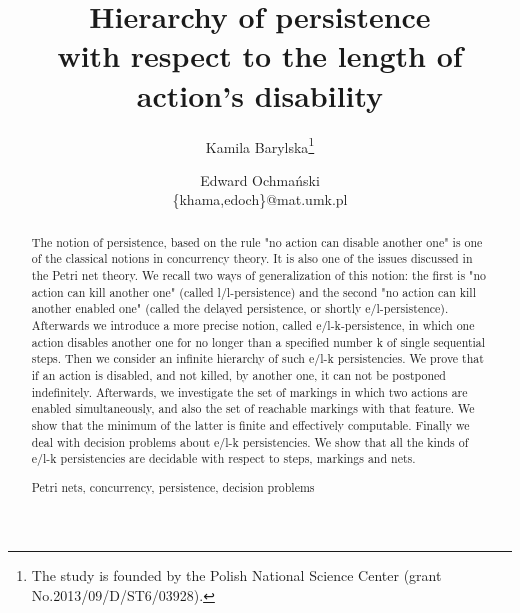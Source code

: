 \documentclass[a4paper]{llncs}
\begin{document}
\title{Hierarchy of persistence \\with respect to the length of action's disability}

\author{Kamila Barylska\thanks{The study is founded 
by the Polish National Science Center
(grant No.2013/09/D/ST6/03928).}\and Edward Ochma\'{n}ski\\
\email\{{khama,edoch\}{@}mat.umk.pl}}


\maketitle

\begin{abstract}
The notion of persistence, based on the rule "no action can disable another one" is one of the classical notions in concurrency theory. It is also one of the issues discussed  in the Petri net theory. We recall two ways of generalization of this notion: the first is "no action can kill another one" (called l/l-persistence) and the second "no action can kill another enabled one" (called the delayed persistence, or shortly e/l-persistence). Afterwards we introduce a more precise notion, called e/l-k-persistence, in which one action disables another one for no longer than a specified number k of single sequential steps. Then we consider an infinite hie\-rarchy of such e/l-k persistencies. We prove that if an action is disabled, and not killed, by another one, it can not be postponed indefinitely.
Afterwards, we investigate the set of markings in which two actions are enabled simultaneously, and also the set of reachable markings with that feature. We show that the minimum of the latter is finite and effectively computable.
Finally we deal with decision problems about e/l-k persistencies. We show that all the kinds of e/l-k persistencies are decidable with respect to steps, markings and nets.


\begin{keywords}
Petri nets, concurrency, persistence, decision problems
\end{keywords}

\end{abstract}
\end{document}
